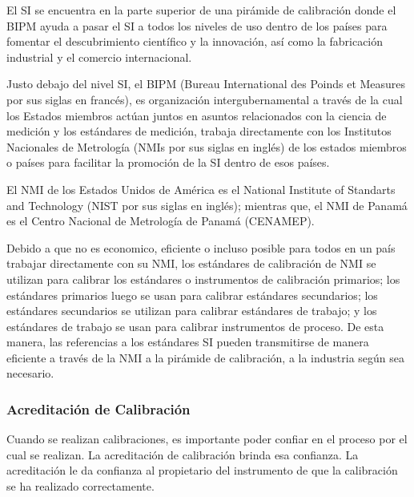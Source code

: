 \par 
El SI se encuentra en la parte superior de una pirámide de calibración donde el BIPM ayuda a pasar el SI a todos los niveles de uso dentro de los países para fomentar el descubrimiento científico y la innovación, así como la fabricación industrial y el comercio internacional.

\par \noindent 
Justo debajo del nivel SI, el BIPM (Bureau International des Poinds et Measures por sus siglas en francés), es organización intergubernamental a través de la cual los Estados miembros actúan juntos
en asuntos relacionados con la ciencia de medición y los estándares de medición, trabaja directamente con los Institutos Nacionales de Metrología (NMIs por sus siglas en inglés) de los estados miembros o países para facilitar la promoción de la SI dentro de esos países.

\par \noindent
El NMI de los Estados Unidos de América es el National Institute of Standarts and Technology (NIST por sus siglas en inglés); mientras que, el NMI de Panamá es el Centro Nacional de Metrología de Panamá (CENAMEP).

\clearpage

\par \noindent
Debido a que no es economico, eficiente o incluso posible para todos en un país trabajar directamente con su NMI, los estándares de calibración de NMI se utilizan para calibrar los estándares o instrumentos de calibración primarios; los estándares primarios luego se usan para calibrar estándares secundarios; los estándares secundarios se utilizan para calibrar estándares de trabajo; y los estándares de trabajo se usan para calibrar instrumentos de proceso. De esta manera, las referencias a los estándares SI pueden transmitirse de manera eficiente a través de la NMI a la pirámide de calibración, a la industria según sea necesario.

\subsubsection{Acreditación de Calibración \cite{calibracion-fluke}}

\par 
Cuando se realizan calibraciones, es importante poder confiar en el proceso por el cual se realizan. La acreditación de calibración brinda esa confianza. La acreditación le da confianza al propietario del instrumento de que la calibración se ha realizado correctamente.

